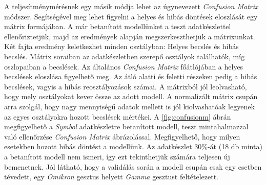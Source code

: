 A teljesítménymérésnek egy másik módja lehet az úgynevezett \textit{Confusion Matrix} módszer. Segítségével meg lehet figyelni a helyes és hibás döntések eloszlását egy mátrix formájában.\cite{koesmarno2019class}
A már betanított modellünket a teszt adatkészlettel ellenőriztetjük, majd az eredmények alapján megszerkeszthetjük a mátrixunkat. Két fajta eredmény keletkezhet minden osztályban: Helyes becslés és hibás becslés. Mátrix soraiban az adatkészletben szerepő osztályok találhatók, míg oszlopaiban a becslések. Az általános \textit{Confusion Matrix} főátlójában a helyes becslések eloszlása figyelhető meg. Az átló alatti és feletti részeken pedig a hibás becslések, vagyis a hibás reosztályozások számai. A mátrixból jól leolvasható, hogy mely osztályokat kever össze az adott modell. A normalizált mátrix csupán arra szolgál, hogy nagy mennyiségű adatok mellett is jól kiolvashatóak legyenek az egyes osztályokra hozott becslések mértékei.
A \ref{fig:confusionm} ábrán megfigyelhető a \textit{Symbol} adatkészletre betanított modell, teszt mintahalmazzal való ellenőrzése \textit{Confusion Matrix} ábrázolással. Megfigyelhető, hogy milyen esetekben hozott hibás döntést a modellünk. Az adatkészlet 30\%-át (18 db minta) a betanított modell nem ismeri, így ezt tekinthetjük számára teljesen új bemenetnek. Jól látható, hogy a validálás során a modell csupán csak egy esetben tévedett, egy \textit{Omikron} gesztus helyett \textit{Gamma} gesztust feltételezett.



